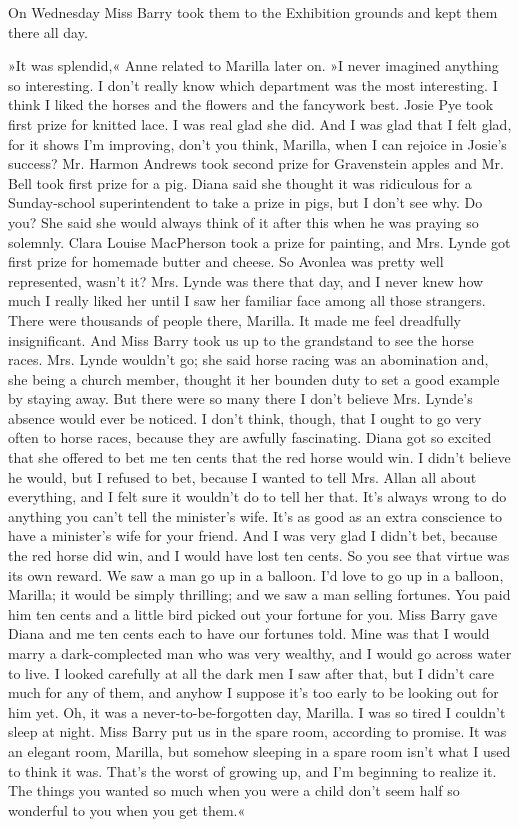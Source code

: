 On Wednesday Miss Barry took them to the Exhibition grounds and kept them there all day.

»It was splendid,« Anne related to Marilla later on. »I never imagined anything so interesting. I don't really know which department was the most interesting. I think I liked the horses and the flowers and the fancywork best. Josie Pye took first prize for knitted lace. I was real glad she did. And I was glad that I felt glad, for it shows I'm improving, don't you think, Marilla, when I can rejoice in Josie's success? Mr. Harmon Andrews took second prize for Gravenstein apples and Mr. Bell took first prize for a pig. Diana said she thought it was ridiculous for a Sunday-school superintendent to take a prize in pigs, but I don't see why. Do you? She said she would always think of it after this when he was praying so solemnly. Clara Louise MacPherson took a prize for painting, and Mrs. Lynde got first prize for homemade butter and cheese. So Avonlea was pretty well represented, wasn't it? Mrs. Lynde was there that day, and I never knew how much I really liked her until I saw her familiar face among all those strangers. There were thousands of people there, Marilla. It made me feel dreadfully insignificant. And Miss Barry took us up to the grandstand to see the horse races. Mrs. Lynde wouldn't go; she said horse racing was an abomination and, she being a church member, thought it her bounden duty to set a good example by staying away. But there were so many there I don't believe Mrs. Lynde's absence would ever be noticed. I don't think, though, that I ought to go very often to horse races, because they are awfully fascinating. Diana got so excited that she offered to bet me ten cents that the red horse would win. I didn't believe he would, but I refused to bet, because I wanted to tell Mrs. Allan all about everything, and I felt sure it wouldn't do to tell her that. It's always wrong to do anything you can't tell the minister's wife. It's as good as an extra conscience to have a minister's wife for your friend. And I was very glad I didn't bet, because the red horse did win, and I would have lost ten cents. So you see that virtue was its own reward. We saw a man go up in a balloon. I'd love to go up in a balloon, Marilla; it would be simply thrilling; and we saw a man selling fortunes. You paid him ten cents and a little bird picked out your fortune for you. Miss Barry gave Diana and me ten cents each to have our fortunes told. Mine was that I would marry a dark-complected man who was very wealthy, and I would go across water to live. I looked carefully at all the dark men I saw after that, but I didn't care much for any of them, and anyhow I suppose it's too early to be looking out for him yet. Oh, it was a never-to-be-forgotten day, Marilla. I was so tired I couldn't sleep at night. Miss Barry put us in the spare room, according to promise. It was an elegant room, Marilla, but somehow sleeping in a spare room isn't what I used to think it was. That's the worst of growing up, and I'm beginning to realize it. The things you wanted so much when you were a child don't seem half so wonderful to you when you get them.«

